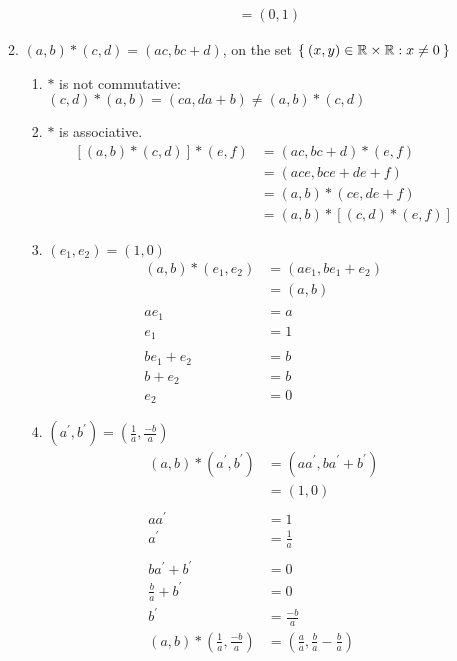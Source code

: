 \begin{enumerate}[label={\Alph*.},font={\bfseries}]
\begin{enumerate}[label={\arabic*},font={\bfseries}]
\begin{enumerate}[label={(\roman*)}]
\begin{align*}
        &= (0,1)
      \end{align*}
    \end{enumerate}
  \item $(a, b) * (c, d) = (ac, bc + d)$, on the set $\Set{(x,y)\in\mathbb{R}\times\mathbb{R} : x \ne 0}$
    \begin{enumerate}[label={(\roman*)}]
    \item $*$ is not commutative: $(c,d) * (a,b) = (ca, da + b) \ne (a,b) * (c,d)$
    \item $*$ is associative.
      \begin{align*}
        \left[(a,b) * (c,d)\right] * (e,f) &= (ac, bc+d) * (e,f) \\
        &= (ace, bce+de+f) \\
        &= (a,b) * (ce, de+f) \\
        &= (a,b) * \left[(c,d) * (e,f)\right]
      \end{align*}
    \item $(e_1,e_2) = (1,0)$
      \begin{align*}
        (a,b) * (e_1,e_2) &= (ae_1, be_1+e_2) \\
        &= (a, b) \\
        \\
        ae_1 &= a \\
        e_1 &= 1 \\
        \\
        be_1+e_2 &= b \\
        b+e_2 &= b \\
        e_2 &= 0
      \end{align*}
    \item $(a^\prime,b^\prime) = (\frac{1}{a},\frac{-b}{a})$
      \begin{align*}
        (a,b) * (a^\prime,b^\prime) &= (aa^\prime, ba^\prime + b^\prime) \\
        &= (1,0) \\
        \\
        aa^\prime &= 1 \\
        a^\prime &= \frac{1}{a} \\
        \\
        ba^\prime + b^\prime &= 0 \\
        \frac{b}{a} + b^\prime &= 0 \\
        b^\prime &= \frac{-b}{a}
        \\
        (a,b) * (\frac{1}{a}, \frac{-b}{a}) &= (\frac{a}{a}, \frac{b}{a} - \frac{b}{a}) \\

\end{align*}
\end{enumerate}
\end{enumerate}
\end{enumerate}
